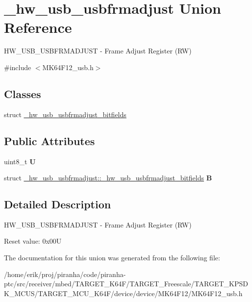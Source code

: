 \hypertarget{union__hw__usb__usbfrmadjust}{}\section{\+\_\+hw\+\_\+usb\+\_\+usbfrmadjust Union Reference}
\label{union__hw__usb__usbfrmadjust}


H\+W\+\_\+\+U\+S\+B\+\_\+\+U\+S\+B\+F\+R\+M\+A\+D\+J\+U\+ST -\/ Frame Adjust Register (RW)  




{\ttfamily \#include $<$M\+K64\+F12\+\_\+usb.\+h$>$}

\subsection*{Classes}
\begin{DoxyCompactItemize}
\item 
struct \hyperlink{struct__hw__usb__usbfrmadjust_1_1__hw__usb__usbfrmadjust__bitfields}{\+\_\+hw\+\_\+usb\+\_\+usbfrmadjust\+\_\+bitfields}
\end{DoxyCompactItemize}
\subsection*{Public Attributes}
\begin{DoxyCompactItemize}
\item 
uint8\+\_\+t {\bfseries U}\hypertarget{union__hw__usb__usbfrmadjust_a7cb683fa940942d7b6f5d77877d9c45f}{}\label{union__hw__usb__usbfrmadjust_a7cb683fa940942d7b6f5d77877d9c45f}

\item 
struct \hyperlink{struct__hw__usb__usbfrmadjust_1_1__hw__usb__usbfrmadjust__bitfields}{\+\_\+hw\+\_\+usb\+\_\+usbfrmadjust\+::\+\_\+hw\+\_\+usb\+\_\+usbfrmadjust\+\_\+bitfields} {\bfseries B}\hypertarget{union__hw__usb__usbfrmadjust_a211c288304c0e2807189f60d47d2290b}{}\label{union__hw__usb__usbfrmadjust_a211c288304c0e2807189f60d47d2290b}

\end{DoxyCompactItemize}


\subsection{Detailed Description}
H\+W\+\_\+\+U\+S\+B\+\_\+\+U\+S\+B\+F\+R\+M\+A\+D\+J\+U\+ST -\/ Frame Adjust Register (RW) 

Reset value\+: 0x00U 

The documentation for this union was generated from the following file\+:\begin{DoxyCompactItemize}
\item 
/home/erik/proj/piranha/code/piranha-\/ptc/src/receiver/mbed/\+T\+A\+R\+G\+E\+T\+\_\+\+K64\+F/\+T\+A\+R\+G\+E\+T\+\_\+\+Freescale/\+T\+A\+R\+G\+E\+T\+\_\+\+K\+P\+S\+D\+K\+\_\+\+M\+C\+U\+S/\+T\+A\+R\+G\+E\+T\+\_\+\+M\+C\+U\+\_\+\+K64\+F/device/device/\+M\+K64\+F12/M\+K64\+F12\+\_\+usb.\+h\end{DoxyCompactItemize}
